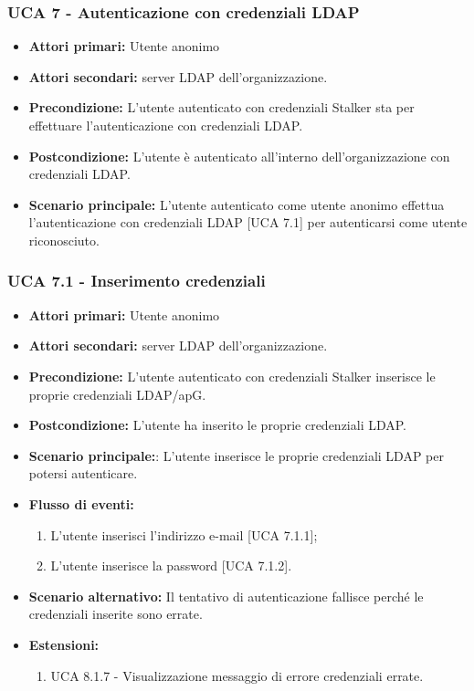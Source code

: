 \subsubsection{UCA 7 - Autenticazione con credenziali LDAP}%


\begin{itemize}
	\item \textbf{Attori primari:} Utente anonimo 
	\item \textbf{Attori secondari:} server LDAP dell'organizzazione.
	\item \textbf{Precondizione:} L'utente autenticato con credenziali Stalker sta per effettuare l'autenticazione con credenziali LDAP.
	\item \textbf{Postcondizione:} L'utente è autenticato all'interno dell'organizzazione con credenziali LDAP.
	\item \textbf{Scenario principale:} L'utente autenticato come utente anonimo effettua l'autenticazione con credenziali LDAP [UCA 7.1] per autenticarsi come utente riconosciuto.
\end{itemize}

\subsubsection{UCA 7.1 - Inserimento credenziali}
\begin{itemize}
	\item \textbf{Attori primari:} Utente anonimo 
	\item \textbf{Attori secondari:} server LDAP dell'organizzazione.
	\item \textbf{Precondizione:} L'utente autenticato con credenziali Stalker inserisce le proprie credenziali LDAP/ap{G}.
	\item \textbf{Postcondizione:} L'utente ha inserito le proprie credenziali LDAP.
	\item \textbf{Scenario principale:}: L'utente inserisce le proprie credenziali LDAP per potersi autenticare.
	\item \textbf{Flusso di eventi:}
	\begin{enumerate}
		\item L'utente inserisci l'indirizzo e-mail [UCA 7.1.1];
		\item L'utente inserisce la password [UCA 7.1.2].
	\end{enumerate}
	\item \textbf{Scenario alternativo:} Il tentativo di autenticazione fallisce perché le credenziali inserite sono errate.
	\item \textbf{Estensioni:}
	\begin{enumerate}
		\item UCA 8.1.7 - Visualizzazione messaggio di errore credenziali errate.
	\end{enumerate}
\end{itemize}

